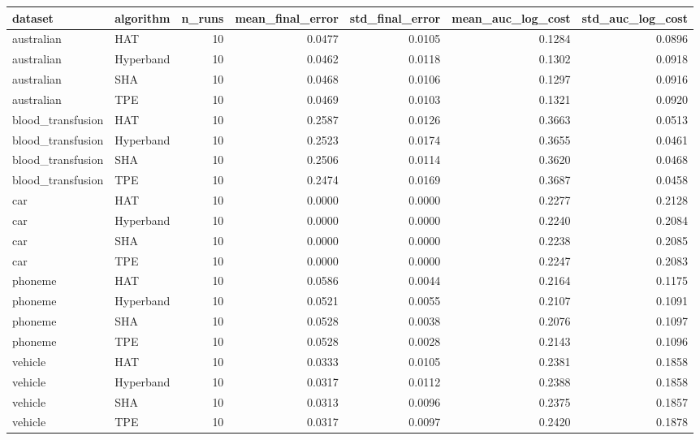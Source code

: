 \begin{tabular}{llrrrrr}
\toprule
dataset & algorithm & n_runs & mean_final_error & std_final_error & mean_auc_log_cost & std_auc_log_cost \\
\midrule
australian & HAT & 10 & 0.0477 & 0.0105 & 0.1284 & 0.0896 \\
australian & Hyperband & 10 & 0.0462 & 0.0118 & 0.1302 & 0.0918 \\
australian & SHA & 10 & 0.0468 & 0.0106 & 0.1297 & 0.0916 \\
australian & TPE & 10 & 0.0469 & 0.0103 & 0.1321 & 0.0920 \\
blood_transfusion & HAT & 10 & 0.2587 & 0.0126 & 0.3663 & 0.0513 \\
blood_transfusion & Hyperband & 10 & 0.2523 & 0.0174 & 0.3655 & 0.0461 \\
blood_transfusion & SHA & 10 & 0.2506 & 0.0114 & 0.3620 & 0.0468 \\
blood_transfusion & TPE & 10 & 0.2474 & 0.0169 & 0.3687 & 0.0458 \\
car & HAT & 10 & 0.0000 & 0.0000 & 0.2277 & 0.2128 \\
car & Hyperband & 10 & 0.0000 & 0.0000 & 0.2240 & 0.2084 \\
car & SHA & 10 & 0.0000 & 0.0000 & 0.2238 & 0.2085 \\
car & TPE & 10 & 0.0000 & 0.0000 & 0.2247 & 0.2083 \\
phoneme & HAT & 10 & 0.0586 & 0.0044 & 0.2164 & 0.1175 \\
phoneme & Hyperband & 10 & 0.0521 & 0.0055 & 0.2107 & 0.1091 \\
phoneme & SHA & 10 & 0.0528 & 0.0038 & 0.2076 & 0.1097 \\
phoneme & TPE & 10 & 0.0528 & 0.0028 & 0.2143 & 0.1096 \\
vehicle & HAT & 10 & 0.0333 & 0.0105 & 0.2381 & 0.1858 \\
vehicle & Hyperband & 10 & 0.0317 & 0.0112 & 0.2388 & 0.1858 \\
vehicle & SHA & 10 & 0.0313 & 0.0096 & 0.2375 & 0.1857 \\
vehicle & TPE & 10 & 0.0317 & 0.0097 & 0.2420 & 0.1878 \\
\bottomrule
\end{tabular}
